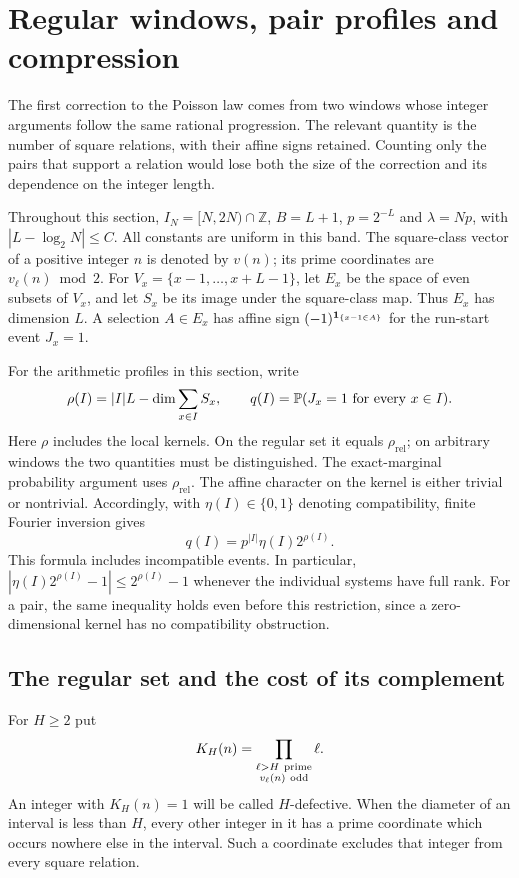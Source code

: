 \section{Regular windows, pair profiles and compression}
\label{p1:arith:section}

The first correction to the Poisson law comes from two windows whose integer
arguments follow the same rational progression.  The relevant quantity is the
number of square relations, with their affine signs retained.  Counting only
the pairs that support a relation would lose both the size of the correction
and its dependence on the integer length.

Throughout this section, $I_N=[N,2N)\cap\mathbb Z$, $B=L+1$,
$p=2^{-L}$ and $\lambda=Np$, with $|L-\log_2N|\leq C$.
All constants are uniform in this band.  The square-class vector of a positive
integer $n$ is denoted by $v(n)$; its prime coordinates are $v_\ell(n)\bmod2$.
For $V_x=\{x-1,\ldots,x+L-1\}$, let $E_x$ be the space of even subsets of
$V_x$, and let $S_x$ be its image under the square-class map.  Thus $E_x$ has
dimension $L$.  A selection $A\in E_x$ has affine sign
$(-1)^{\ind_{\{x-1\in A\}}}$ for the run-start event $J_x=1$.

For the arithmetic profiles in this section, write
\[
 \rho(I)=|I|L-\dim\sum_{x\in I}S_x,\qquad
 q(I)=\P(J_x=1\text{ for every }x\in I).
\]
Here $\rho$ includes the local kernels. On the regular set it equals
$\rho_{\mathrm{rel}}$; on arbitrary windows the two quantities must be
distinguished. The exact-marginal probability argument uses
$\rho_{\mathrm{rel}}$.
The affine character on the kernel is either trivial or nontrivial.  Accordingly,
with $\eta(I)\in\{0,1\}$ denoting compatibility, finite Fourier inversion gives
\begin{equation}\label{p1:arith:affine}
 q(I)=p^{|I|}\eta(I)2^{\rho(I)}.
\end{equation}
This formula includes incompatible events.  In particular,
$|\eta(I)2^{\rho(I)}-1|\leq2^{\rho(I)}-1$ whenever the individual systems
have full rank.  For a pair, the same inequality holds even before this
restriction, since a zero-dimensional kernel has no compatibility obstruction.

\subsection{The regular set and the cost of its complement}

For $H\geq2$ put
\[
 K_H(n)=\prod_{\substack{\ell>H\ {\rm prime}\\v_\ell(n)\ {\rm odd}}}\ell.
\]
An integer with $K_H(n)=1$ will be called $H$-defective.  When the diameter of
an interval is less than $H$, every other integer in it has a prime coordinate
which occurs nowhere else in the interval.  Such a coordinate excludes that
integer from every square relation.

